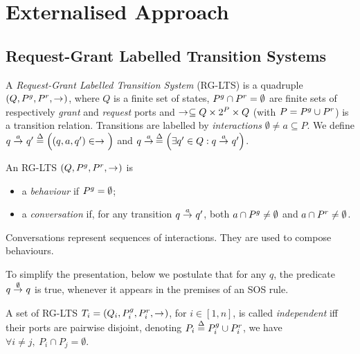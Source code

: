 
\section{Externalised Approach}
\label{sec:external}


\subsection{Request-Grant Labelled Transition Systems}
\label{sec:external:model}

\begin{definition}
\label{defn:lts}
A \emph{Request-Grant Labelled Transition System} (RG-LTS) is a quadruple
$(Q,\pin,\pout,\goesto[])$, where $Q$ is a finite set of states, $\pin \cap
\pout = \emptyset$ are finite sets of respectively {\em grant} and {\em
  request} ports and $\goesto[] \subseteq Q \times 2^P \times Q$ (with $P =
\pin \cup \pout$) is a transition relation.  Transitions are labelled by
\emph{interactions} $\emptyset \neq a \subseteq P$.  We define $q
\goesto[a] q' \bydef{=}\Big((q, a, q') \in \goesto[]\Big)$ and $q
\goesto[a]\, \bydef{=}\Big(\exists q' \in Q: q \goesto[a] q'\Big)$.  
\end{definition}

\begin{definition}
\label{defn:components}
An RG-LTS $(Q, \pin, \pout, \goesto)$ is 
\begin{itemize}
\item a {\em behaviour} if $\pin  = \emptyset$;
\item a \emph{conversation} if, for any transition $q \goesto[a] q'$, both
  $a \cap \pin \neq \emptyset$ and $a \cap \pout \neq \emptyset$.
\end{itemize}
\end{definition}

Conversations represent sequences of interactions. They are used to compose
behaviours.

To simplify the presentation, below we postulate that for any $q$, the
predicate $q \goesto[\emptyset] q$ is true, whenever it appears in the
premises of an SOS rule.

\begin{definition}
  \label{defn:independent}
  A set of RG-LTS $T_i = (Q_i, \pin_i, \pout_i, \goesto)$, for $i \in
  [1,n]$, is called {\em independent} iff their ports are pairwise
  disjoint, \ie[,] denoting $P_i \bydef{=} \pin_i \cup \pout_i$, we have
  $\forall i \neq j,\ P_i \cap P_j = \emptyset$.
\end{definition}

